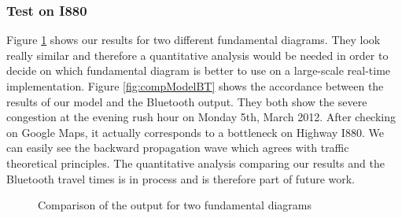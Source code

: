 \documentclass[letterpaper,10pt]{article}
\begin{document}
\subsubsection{Test on I880}

Figure \ref{fig:comp2FD} shows our results for two different fundamental diagrams. They look really similar and therefore a quantitative analysis would be needed in order to decide on which fundamental diagram is better to use on a large-scale real-time implementation. Figure \ref{fig:compModelBT} shows the accordance between the results of our model and the Bluetooth output. They both show the severe congestion at the evening rush hour on Monday 5th, March 2012. After checking on Google Maps, it actually corresponds to a bottleneck on Highway I880. We can easily see the backward propagation wave which agrees with traffic theoretical principles. The quantitative analysis comparing our results and the Bluetooth travel times is in process and is therefore part of future work.

\begin{figure}
  \begin{center}
      
  \end{center}
  \caption{Comparison of the output for two fundamental diagrams}
  \label{fig:comp2FD}
\end{figure}
\end{document}
